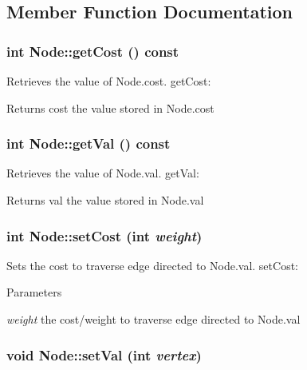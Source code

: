 \subsection{Member Function Documentation}
\hypertarget{structNode_a91e4e810ff0506963c534a09b7caaab3}{
\subsubsection[{getCost}]{\setlength{\rightskip}{0pt plus 5cm}int Node::getCost () const}}
\label{structNode_a91e4e810ff0506963c534a09b7caaab3}


Retrieves the value of Node.cost. getCost: \begin{DoxyReturn}{Returns}
cost the value stored in Node.cost 
\end{DoxyReturn}
\hypertarget{structNode_a957988714d1379c48c42a78d28c3e76f}{
\subsubsection[{getVal}]{\setlength{\rightskip}{0pt plus 5cm}int Node::getVal () const}}
\label{structNode_a957988714d1379c48c42a78d28c3e76f}


Retrieves the value of Node.val. getVal: \begin{DoxyReturn}{Returns}
val the value stored in Node.val 
\end{DoxyReturn}
\hypertarget{structNode_a7463c53f33afec1d2b9535f8b0f26ef1}{
\subsubsection[{setCost}]{\setlength{\rightskip}{0pt plus 5cm}int Node::setCost (int {\em weight})}}
\label{structNode_a7463c53f33afec1d2b9535f8b0f26ef1}


Sets the cost to traverse edge directed to Node.val. setCost: 
\begin{DoxyParams}{Parameters}
\item[{\em weight}]the cost/weight to traverse edge directed to Node.val \end{DoxyParams}
\hypertarget{structNode_ad2e319a35d03a16c1e8475025ebe3053}{
\subsubsection[{setVal}]{\setlength{\rightskip}{0pt plus 5cm}void Node::setVal (int {\em vertex})}}
\label{structNode_ad2e319a35d03a16c1e8475025ebe3053}


